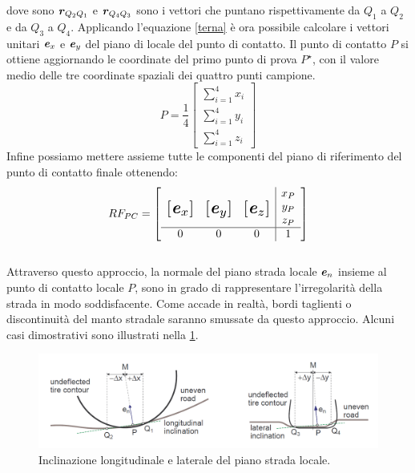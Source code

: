 %
dove sono $\textbf{\textit{r}}_{Q_2 Q_1}$ e $\textbf{\textit{r}}_{Q_4 Q_3}$ sono i vettori che puntano rispettivamente da $Q_1$ a $Q_2$ e da $Q_3$ a $Q_4$. Applicando l'equazione \ref{terna} è ora possibile calcolare i vettori unitari $\textbf{\textit{e}}_{x}$ e $\textbf{\textit{e}}_{y}$ del piano di locale del punto di contatto. Il punto di contatto $P$ si ottiene aggiornando le coordinate del primo punto di prova $P^\star$, con il valore medio delle tre coordinate spaziali dei quattro punti campione.
%
\begin{equation}
P = \frac{1}{4}\begin{bmatrix}
\sum_{i=1}^{4} x_i \\
\sum_{i=1}^{4} y_i \\
\sum_{i=1}^{4} z_i
\end{bmatrix}
\end{equation}
%
Infine possiamo mettere assieme tutte le componenti del piano di riferimento del punto di contatto finale ottenendo:
%
\begin{equation}
RF_{PC} = \left[
\begin{array}{ccc|c}
& & & x_P\\
\multirow{3}{*}{\raisebox{20mm}{\scalebox{1.5}{$\left[\textbf{\textit{e}}_x\right]$}}} & \multirow{3}{*}{\raisebox{20mm}{\scalebox{1.5}{$\left[\textbf{\textit{e}}_y\right]$}}} & \multirow{3}{*}{\raisebox{20mm}{\scalebox{1.5}{$\left[\textbf{\textit{e}}_z\right]$}}} & y_P\\
& & & z_P\\ \hline
0 & 0 & 0 & 1
\end{array}\right]
\end{equation}\\
Attraverso questo approccio, la normale del piano strada locale $\textbf{\textit{e}}_{n}$ insieme al punto di contatto locale $P$, sono in grado di rappresentare l'irregolarità della strada in modo soddisfacente. Come accade in realtà, bordi taglienti o discontinuità del manto stradale saranno smussate da questo approccio. Alcuni casi dimostrativi sono illustrati nella \figurename{  \ref{localplane}}.

\begin{figure}[h]
	\centering
	\includegraphics[width=\linewidth]{Figures/local_plane}
	\caption{Inclinazione longitudinale e laterale del piano strada locale.}
	\label{localplane}
\end{figure}